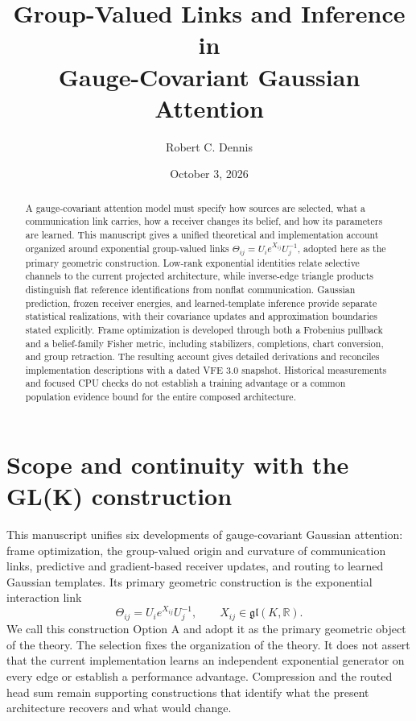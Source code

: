 \documentclass[11pt]{article}
\title{Group-Valued Links and Inference in\\Gauge-Covariant Gaussian Attention}
\author{Robert C. Dennis}
\date{October 3, 2026}
\theoremstyle{definition}
\theoremstyle{remark}
\begin{document}
\maketitle
\begin{abstract}
A gauge-covariant attention model must specify how sources are selected, what a communication link carries, how a receiver changes its belief, and how its parameters are learned. This manuscript gives a unified theoretical and implementation account organized around exponential group-valued links $\Theta_{ij}=U_i e^{X_{ij}}U_j^{-1}$, adopted here as the primary geometric construction. Low-rank exponential identities relate selective channels to the current projected architecture, while inverse-edge triangle products distinguish flat reference identifications from nonflat communication. Gaussian prediction, frozen receiver energies, and learned-template inference provide separate statistical realizations, with their covariance updates and approximation boundaries stated explicitly. Frame optimization is developed through both a Frobenius pullback and a belief-family Fisher metric, including stabilizers, completions, chart conversion, and group retraction. The resulting account gives detailed derivations and reconciles implementation descriptions with a dated VFE 3.0 snapshot. Historical measurements and focused CPU checks do not establish a training advantage or a common population evidence bound for the entire composed architecture.
\end{abstract}
\tableofcontents
\clearpage

\section{Scope and continuity with the GL(K) construction}
\label{unified:scope}

This manuscript unifies six developments of gauge-covariant Gaussian attention: frame optimization, the group-valued origin and curvature of communication links, predictive and gradient-based receiver updates, and routing to learned Gaussian templates. Its primary geometric construction is the exponential interaction link
\begin{equation}
\Theta_{ij}=U_i e^{X_{ij}}U_j^{-1}, \qquad X_{ij}\in\mathfrak{gl}(K,\mathbb R).
\label{unified:primary_link}
\end{equation}
We call this construction Option A and adopt it as the primary geometric object of the theory. The selection fixes the organization of the theory. It does not assert that the current implementation learns an independent exponential generator on every edge or establish a performance advantage. Compression and the routed head sum remain supporting constructions that identify what the present architecture recovers and what would change.
\end{document}
